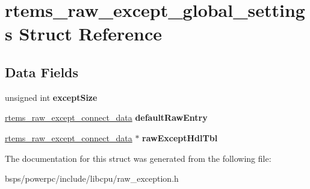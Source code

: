 \hypertarget{structrtems__raw__except__global__settings}{}\section{rtems\+\_\+raw\+\_\+except\+\_\+global\+\_\+settings Struct Reference}
\label{structrtems__raw__except__global__settings}
\subsection*{Data Fields}
\begin{DoxyCompactItemize}
\item 
\mbox{\label{structrtems__raw__except__global__settings_a6a4778546c08a1243cbbe140637505c8}} 
unsigned int {\bfseries except\+Size}
\item 
\mbox{\label{structrtems__raw__except__global__settings_abbcb6688dac41e74897e5b80e110b2b0}} 
\mbox{\hyperlink{struct____rtems__raw__except__connect__data____}{rtems\+\_\+raw\+\_\+except\+\_\+connect\+\_\+data}} {\bfseries default\+Raw\+Entry}
\item 
\mbox{\label{structrtems__raw__except__global__settings_ae0211b06678409cbe82e9ab421b01897}} 
\mbox{\hyperlink{struct____rtems__raw__except__connect__data____}{rtems\+\_\+raw\+\_\+except\+\_\+connect\+\_\+data}} $\ast$ {\bfseries raw\+Except\+Hdl\+Tbl}
\end{DoxyCompactItemize}


The documentation for this struct was generated from the following file\+:\begin{DoxyCompactItemize}
\item 
bsps/powerpc/include/libcpu/raw\+\_\+exception.\+h\end{DoxyCompactItemize}
